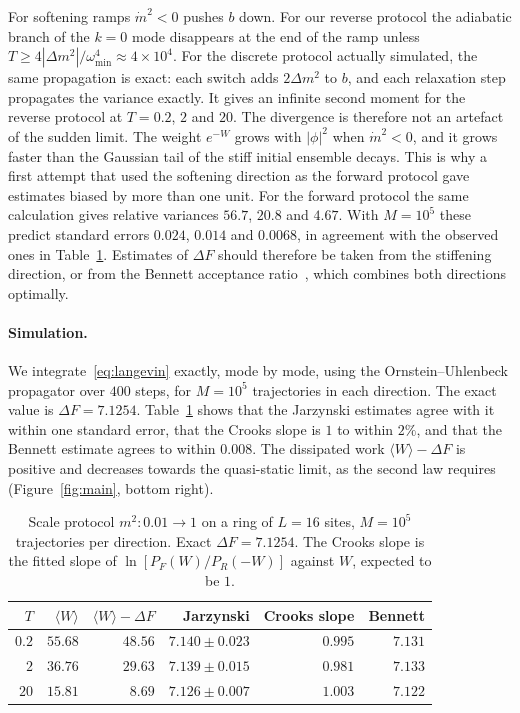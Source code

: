\documentclass[11pt]{article}
\theoremstyle{remark}\newtheorem*{remark}{Remark}
\begin{document}
For softening ramps $\dot m^2<0$ pushes $b$ down. For our reverse protocol the adiabatic branch of the $k=0$ mode
disappears at the end of the ramp unless $T\ge4|\Delta m^2|/\omega_{\min}^4\approx4\times10^4$. For the discrete
protocol actually simulated, the same propagation is exact: each switch adds $2\Delta m^2$ to $b$, and each relaxation
step propagates the variance exactly. It gives an infinite second moment for the reverse protocol at $T=0.2$, $2$ and
$20$. The divergence is therefore not an artefact of the sudden limit. The weight $e^{-W}$ grows with $|\phi|^2$
when $\dot m^2<0$, and it grows faster than the Gaussian tail of the stiff initial ensemble decays. This is why a
first attempt that used the softening direction as the forward protocol gave estimates biased by more than one
unit. For the forward protocol the same calculation gives relative variances $56.7$, $20.8$ and $4.67$. With
$M=10^5$ these predict standard errors $0.024$, $0.014$ and $0.0068$, in agreement with the observed ones in
Table~\ref{tab:jc}. Estimates of $\Delta F$ should therefore be taken from the stiffening direction, or from the
Bennett acceptance ratio~\cite{BAR,Shirts}, which combines both directions optimally.

\paragraph{Simulation.}
We integrate~\eqref{eq:langevin} exactly, mode by mode, using the Ornstein--Uhlenbeck propagator over $400$ steps, for
$M=10^5$ trajectories in each direction. The exact value is $\Delta F=7.1254$. Table~\ref{tab:jc} shows that the
Jarzynski estimates agree with it within one standard error, that the Crooks slope is $1$ to within $2\%$, and that
the Bennett estimate agrees to within $0.008$. The dissipated work $\langle W\rangle-\Delta F$ is positive and
decreases towards the quasi-static limit, as the second law requires (Figure~\ref{fig:main}, bottom right).

\begin{table}[h]
\centering
\caption{Scale protocol $m^2:0.01\to1$ on a ring of $L=16$ sites, $M=10^5$ trajectories per direction. Exact
$\Delta F=7.1254$. The Crooks slope is the fitted slope of $\ln[P_F(W)/P_R(-W)]$ against $W$, expected to be $1$.}
\label{tab:jc}
\begin{tabular}{rrrrrr}
\toprule
$T$ & $\langle W\rangle$ & $\langle W\rangle-\Delta F$ & Jarzynski & Crooks slope & Bennett \\
\midrule
$0.2$ & $55.68$ & $48.56$ & $7.140\pm0.023$ & $0.995$ & $7.131$ \\
$2$ & $36.76$ & $29.63$ & $7.139\pm0.015$ & $0.981$ & $7.133$ \\
$20$ & $15.81$ & $8.69$ & $7.126\pm0.007$ & $1.003$ & $7.122$ \\
\bottomrule
\end{tabular}
\end{table}
\end{document}
